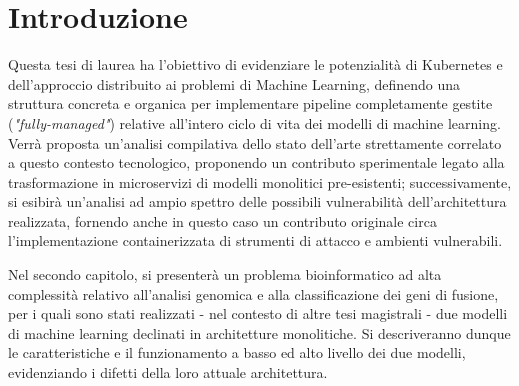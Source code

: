 % 
% 
% 



\clearpage
\cleardoublepage

\chapter{Introduzione}

Questa tesi di laurea ha l'obiettivo di evidenziare le potenzialità di Kubernetes e dell'approccio distribuito ai problemi di Machine Learning, definendo una struttura concreta e organica per implementare pipeline completamente gestite ({\em "fully-managed"}) relative all'intero ciclo di vita dei modelli di machine learning. Verrà proposta un'analisi compilativa dello stato dell'arte strettamente correlato a questo contesto tecnologico, proponendo un contributo sperimentale legato alla trasformazione in microservizi di modelli monolitici pre-esistenti; successivamente, si esibirà un'analisi ad ampio spettro delle possibili vulnerabilità dell'architettura realizzata, fornendo anche in questo caso un contributo originale circa l'implementazione containerizzata di strumenti di attacco e ambienti vulnerabili.

Nel secondo capitolo, si presenterà un problema bioinformatico ad alta complessità relativo all'analisi genomica e alla classificazione dei geni di fusione, per i quali sono stati realizzati - nel contesto di altre tesi magistrali - due modelli di machine learning declinati in architetture monolitiche. Si descriveranno dunque le caratteristiche e il funzionamento a basso ed alto livello dei due modelli, evidenziando i difetti della loro attuale architettura.

